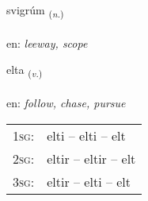 \documentclass[frontgrid, backgrid]{flacards}\usepackage[]{graphicx}\usepackage[]{xcolor}
\begin{document}
\renewcommand{\blhead}{\vskip5pt {\small\bfseries\footnotesize Nafnorð | Noun }}
\renewcommand{\bcfoot}{\vskip5pt \hspace{2pt}{\small\bfseries\footnotesize 3K}}


{svigrúm \small{\textsubscript{(\textit{n.})}} \\[1ex] %
\textphonetic{[svɪɣrum]} \\
en: \emph{leeway, scope} \\  [2ex]
\renewcommand*{\arraystretch}{0.8}
}

\renewcommand{\flhead}{\vskip5pt \fboxsep=0pt {\small\bfseries\footnotesize Sagnorð | Verb}}
\renewcommand{\fcfoot}{\vskip5pt \fboxsep=0pt \hspace{2pt}{\small\bfseries\footnotesize 3K}}

\renewcommand{\blhead}{\vskip5pt {\small\bfseries\footnotesize Sagnorð | Verb }}
\renewcommand{\bcfoot}{\vskip5pt \hspace{2pt}{\small\bfseries\footnotesize 3K}}


{elta \small{\textsubscript{(\textit{v.})}} \\[1ex] %
\textphonetic{[ɛl̥ta]} \\
en: \emph{follow, chase, pursue} \\  [2ex]
\renewcommand*{\arraystretch}{0.8}
\begin{tabular}{p{1cm}l}
\textsc{1sg}: & elti -- elti -- elt \\ 
\textsc{2sg}: & eltir -- eltir -- elt \\ 
\textsc{3sg}: & eltir -- elti -- elt \\ 
\end{tabular}
}
\end{document}
